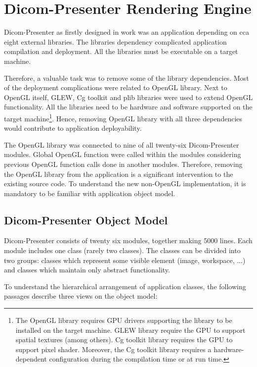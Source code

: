 \chapter{Dicom-Presenter Rendering Engine}
\vspace{-10mm}
Dicom-Presenter as firstly designed in work \cite{neskudla} was an application depending on cca eight external libraries. The libraries dependency complicated application compilation and deployment. All the libraries must be executable on a target machine.

Therefore, a valuable task was to remove some of the library dependencies. Most of the deployment complications were related to OpenGL library. Next to OpenGL itself, GLEW, Cg toolkit and plib libraries were used to extend OpenGL functionality. All the libraries need to be hardware and software supported on the target machine\footnote{The OpenGL library requires GPU drivers supporting the library to be installed on the target machine. GLEW library require the GPU to support spatial textures (among others). Cg toolkit library requires the GPU to support pixel shader. Moreover, the Cg toolkit library requires a hardware-dependent configuration during the compilation time or at run time.}. Hence, removing OpenGL library with all three dependencies would contribute to application deployability.

The OpenGL library was connected to nine of all twenty-six Dicom-Presenter modules. Global OpenGL function were called within the modules considering previous OpenGL function calls done in another modules. Therefore, removing the OpenGL library from the application is a significant intervention to the existing source code. To understand the new non-OpenGL implementation, it is mandatory to be familiar with application object model.

\section{Dicom-Presenter Object Model}

Dicom-Presenter consists of twenty six modules, together making 5000 lines. Each module includes one class (rarely two classes). The classes can be divided into two groups: classes which represent some visible element (image, workspace, ...) and classes which maintain only abstract functionality.

To understand the hierarchical arrangement of application classes, the following passages describe three views on the object model:

